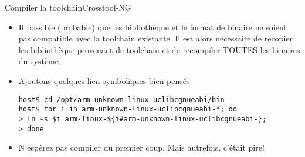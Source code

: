 \begin{frame}[fragile=singleslide]{Compiler la toolchain}{Crosstool-NG}
  \begin{itemize}
      \item Il  possible (probable) que les bibliothèque  et le format
        de  binaire  ne  soient   pas  compatible  avec  la  toolchain
        existante.    Il  est   alors  nécessaire   de   recopier  les
        bibliothèque  provenant de toolchain  et de  recompiler TOUTES
        les binaires du système
      \item Ajoutons quelques lien symboliques bien pensés
       \begin{lstlisting}[basicstyle=\ttfamily\scriptsize\color{colBasic}]
host$ cd /opt/arm-unknown-linux-uclibcgnueabi/bin
host$ for i in arm-unknown-linux-uclibcgnueabi-*; do
> ln -s $i arm-linux-${i#arm-unknown-linux-uclibcgnueabi-};
> done
	\end{lstlisting}
      \item N'espérez  pas compiler  du premier coup.  Mais autrefois,
        c'était pire!
      \end{itemize}
\end{frame}


